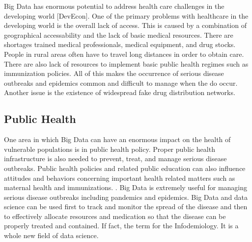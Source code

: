 \documentclass[sigconf]{acmart}
\begin{document}
Big Data has enormous potential to address health care challenges in the developing world [DevEcon]. One of the primary problems with healthcare in the developing world is the overall lack of access. This is caused by a combination of geographical accessability and the lack of basic medical resources. There are shortages trained medical professionals, medical equipment,  and drug stocks. People in rural areas often have to travel long distances in order to obtain care. There are also lack of resources to implement basic public health regimes such as immunization policies.  All of this makes the occurrence of serious disease outbreaks and epidemics common and difficult to manage when the do occur. Another issue is the existence of widespread fake drug distribution networks. 
\subsection{Public Health}
One area in which Big Data can have an enormous impact on the health of vulnerable populations is in public health policy. Proper public health infrastructure is also needed to prevent, treat, and manage serious disease outbreaks. Public health policies and related public education can also influence attitudes and behaviors concerning important health related matters such as maternal health and immunizations. .  
Big Data is extremely useful for managing serious disease outbreaks including pandemics and epidemics. Big Data and data science can be used first to track and monitor the spread of the disease and then to effectively allocate resources and medication so that the disease can be properly treated and contained. If fact, the term for the Infodemiology. It is a whole new field of data science.  
\end{document}
